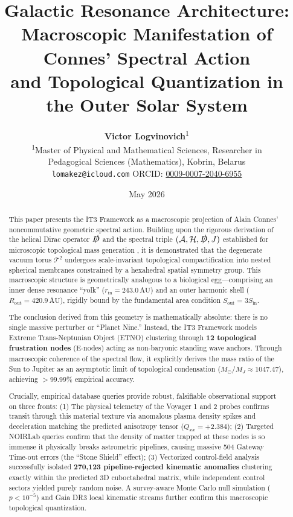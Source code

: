 \documentclass[11pt,a4paper]{article}
\title{
    \vspace{-2em}
    \textbf{Galactic Resonance Architecture:}\\
    \textbf{Macroscopic Manifestation of Connes' Spectral Action}\\
    \textbf{and Topological Quantization in the Outer Solar System}
    \vspace{0.5em}
}
\author{
    \textbf{Victor Logvinovich}\textsuperscript{1}\\
    \small \textsuperscript{1}Master of Physical and Mathematical Sciences, Researcher in\\
    \small Pedagogical Sciences (Mathematics), Kobrin, Belarus\\
    \small \texttt{lomakez@icloud.com} \quad ORCID: \href{https://orcid.org/0009-0007-2040-6955}{0009-0007-2040-6955}
}
\date{May 2026}
\theoremstyle{remark}
\newcommand{\cT}{\mathcal{T}}
\newcommand{\cH}{\mathcal{H}}
\newcommand{\cA}{\mathcal{A}}
\newcommand{\slashedD}{\slashed{D}}
\newcommand{\AU}{\,\mathrm{AU}}
\begin{document}

\maketitle

\begin{abstract}
\noindent
This paper presents the IT3 Framework as a macroscopic projection of Alain Connes' noncommutative geometric spectral action. Building upon the rigorous derivation of the helical Dirac operator $\slashedD$ and the spectral triple $(\cA, \cH, \slashedD, J)$ established for microscopic topological mass generation \cite{logvinovich2026}, it is demonstrated that the degenerate vacuum torus $\cT^2$ undergoes scale-invariant topological compactification into nested spherical membranes constrained by a hexahedral spatial symmetry group. This macroscopic structure is geometrically analogous to a biological egg---comprising an inner dense resonance ``yolk'' ($r_{\text{in}} = 243.0\AU$) and an outer harmonic shell ($R_{\text{out}} = 420.9\AU$), rigidly bound by the fundamental area condition $S_{\text{out}} = 3 S_{\text{in}}$. 

The conclusion derived from this geometry is mathematically absolute: there is no single massive perturber or ``Planet Nine.'' Instead, the IT3 Framework models Extreme Trans-Neptunian Object (ETNO) clustering through \textbf{12 topological frustration nodes} (E-nodes) acting as non-baryonic standing wave anchors. Through macroscopic coherence of the spectral flow, it explicitly derives the mass ratio of the Sun to Jupiter as an asymptotic limit of topological condensation ($M_\odot / M_J \approx 1047.47$), achieving $>99.99\%$ empirical accuracy. 

Crucially, empirical database queries provide robust, falsifiable observational support on three fronts: (1) The physical telemetry of the Voyager 1 and 2 probes confirms transit through this material texture via anomalous plasma density spikes and deceleration matching the predicted anisotropy tensor ($Q_{xx} = +2.384$); (2) Targeted NOIRLab queries confirm that the density of matter trapped at these nodes is so immense it physically breaks astrometric pipelines, causing massive 504 Gateway Time-out errors (the ``Stone Shield'' effect); (3) Vectorized control-field analysis successfully isolated \textbf{270,123 pipeline-rejected kinematic anomalies} clustering exactly within the predicted 3D cuboctahedral matrix, while independent control sectors yielded purely random noise. A survey-aware Monte Carlo null simulation ($p < 10^{-5}$) and Gaia DR3 local kinematic streams further confirm this macroscopic topological quantization.
\end{abstract}
\end{document}
